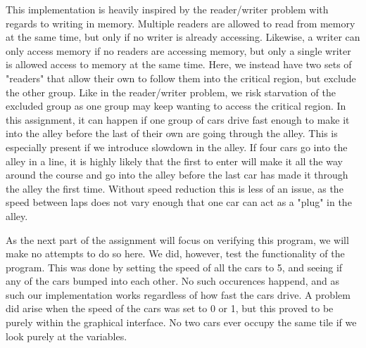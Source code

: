 This implementation is heavily inspired by the reader/writer problem with regards to writing in memory\cite{andrews}. Multiple readers are allowed to read from memory at the same time, but only if no writer is already accessing. Likewise, a writer can only access memory if no readers are accessing memory, but only a single writer is allowed access to memory at the same time. Here, we instead have two sets of "readers" that allow their own to follow them into the critical region, but exclude the other group. Like in the reader/writer problem, we risk starvation of the excluded group as one group may keep wanting to access the critical region. In this assignment, it can happen if one group of cars drive fast enough to make it into the alley before the last of their own are going through the alley. This is especially present if we introduce slowdown in the alley. If four cars go into the alley in a line, it is highly likely that the first to enter will make it all the way around the course and go into the alley before the last car has made it through the alley the first time. Without speed reduction this is less of an issue, as the speed between laps does not vary enough that one car can act as a "plug" in the alley.

As the next part of the assignment will focus on verifying this program, we will make no attempts to do so here. We did, however, test the functionality of the program. This was done by setting the speed of all the cars to 5, and seeing if any of the cars bumped into each other. No such occurences happend, and as such our implementation works regardless of how fast the cars drive. A problem did arise when the speed of the cars was set to 0 or 1, but this proved to be purely within the graphical interface. No two cars ever occupy the same tile if we look purely at the variables. 
 





 